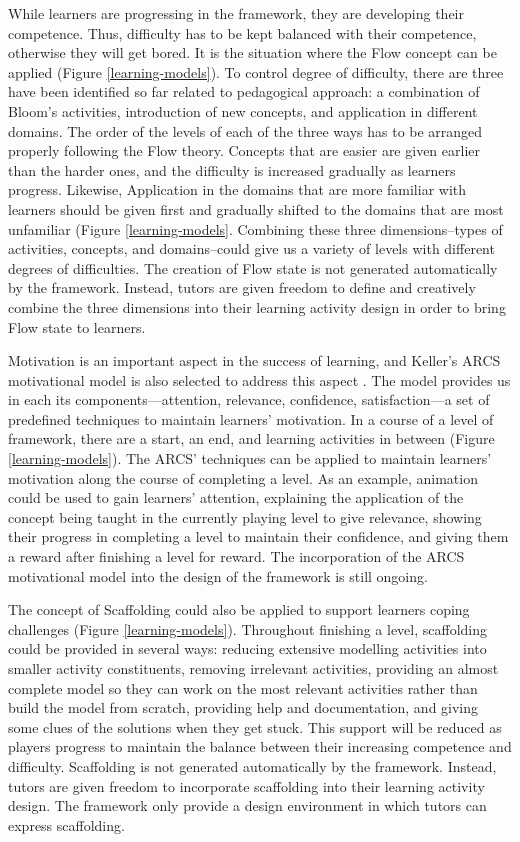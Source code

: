 \documentclass[12pt, a4paper]{report} \usepackage[titletoc]{appendix}
\begin{document}
While learners are progressing in the framework, they are developing their competence. Thus, difficulty has to be kept balanced with their competence, otherwise they will get bored. It is the situation where the Flow concept \cite{csikszentmihalyi2014toward} can be applied (Figure \ref{learning-models}). To control degree of difficulty, there are three have been identified so far related to pedagogical approach: a combination of Bloom's activities, introduction of new concepts, and application in different domains. The order of the levels of each of the three ways has to be arranged properly following the Flow theory. Concepts that are easier are given earlier than the harder ones, and the difficulty is increased gradually as learners progress. Likewise, Application in the domains that are more familiar with learners should be given first and gradually shifted to the domains that are most unfamiliar (Figure \ref{learning-models}. Combining these three dimensions--types of activities, concepts, and domains--could give us a variety of levels with different degrees of difficulties. The creation of Flow state is not generated automatically by the framework. Instead, tutors are given freedom to define and creatively combine the three dimensions into their learning activity design in order to bring Flow state to learners.

Motivation is an important aspect in the success of learning, and Keller's ARCS motivational model is also selected to address this aspect \cite{keller2010motivational}. The model provides us in each its components---attention, relevance, confidence, satisfaction---a set of predefined techniques to maintain learners' motivation. In a course of a level of framework, there are a start, an end, and learning activities in between (Figure \ref{learning-models}). The ARCS' techniques can be applied to maintain learners' motivation along the course of completing a level. As an example, animation could be used to gain learners' attention, explaining the application of the concept being taught in the currently playing level to give relevance, showing their progress in completing a level to maintain their confidence, and giving them a reward after finishing a level for reward. The incorporation of the ARCS motivational model into the design of the framework is still ongoing.
 
The concept of Scaffolding \cite{vygotsky1978mind, wood1976role} could also be applied to support learners coping challenges (Figure \ref{learning-models}). Throughout finishing a level, scaffolding could be provided in several ways: reducing extensive modelling activities into smaller activity constituents, removing irrelevant activities, providing an almost complete model so they can work on the most relevant activities rather than build the model from scratch, providing help and documentation, and giving some clues of the solutions when they get stuck. This support will be reduced as players progress to maintain the balance between their increasing competence and difficulty. Scaffolding is not generated automatically by the framework. Instead, tutors are given freedom to incorporate scaffolding into their learning activity design. The framework only provide a design environment in which tutors can express scaffolding.
\end{document}
